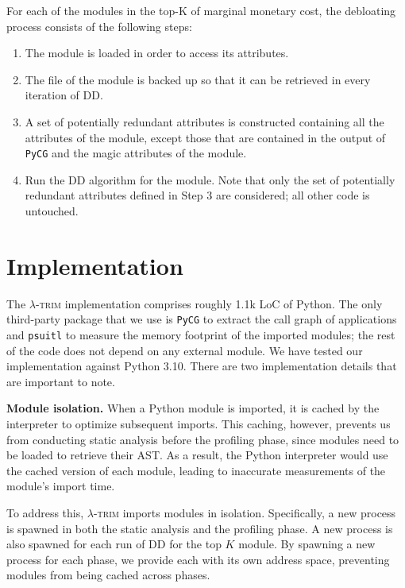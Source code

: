 \documentclass[sigplan,nonacm]{acmart}
\newenvironment{vinenum}
{\begin{enumerate}[leftmargin=2.5em]
  \setlength{\itemsep}{0pt}
  \setlength{\labelwidth}{1em}
\setlength{\parsep}{0pt}
\setlength{\topsep}{0pt}
  \setlength{\partopsep}{0px}
  }
{\end{enumerate}}
\newcommand{\sys}{\textsc{\ensuremath{\lambda}-trim}\xspace}
\newcommand{\heading}[1]{\vspace{4pt}\noindent\textbf{#1.}}
\begin{document}
For each of the modules in the top-K of marginal monetary cost, the debloating process consists of the following steps:

\begin{vinenum}
    \item The module is loaded in order to access its attributes.
    \item The  file of the module is backed up so that it can be retrieved in every iteration of DD.
    \item A set of potentially redundant attributes is constructed containing all the attributes of the module, except those that are contained in the output of \texttt{PyCG} and the magic attributes of the module.
    \item Run the DD algorithm for the module.
    Note that only the set of potentially redundant attributes defined in Step 3 are considered; all other code is untouched.
\end{vinenum}


 
\section{Implementation}

The \sys implementation comprises roughly 1.1k LoC of Python.
The only third-party package that we use is \texttt{PyCG} \cite{pycg2021} to extract the call graph of applications
and \texttt{psuitl} to measure the memory footprint of the imported modules; the rest of the code does not depend on any external module.
We have tested our implementation against Python 3.10.
There are two implementation details that are important to note.

\heading{Module isolation} When a Python module is imported, it is cached by the interpreter to optimize subsequent imports. 
This caching, however, prevents us from conducting static analysis before the profiling phase, since modules need to be loaded to retrieve their AST.
As a result, the Python interpreter would use the cached version of each module, leading to inaccurate measurements of the module's import time.

To address this, \sys imports modules in isolation.
Specifically, a new process is spawned in both the static analysis and the profiling phase.
A new process is also spawned for each run of DD for the top $K$ module.
By spawning a new process for each phase, we provide each with its own address space, preventing modules from being cached across phases.
\end{document}
